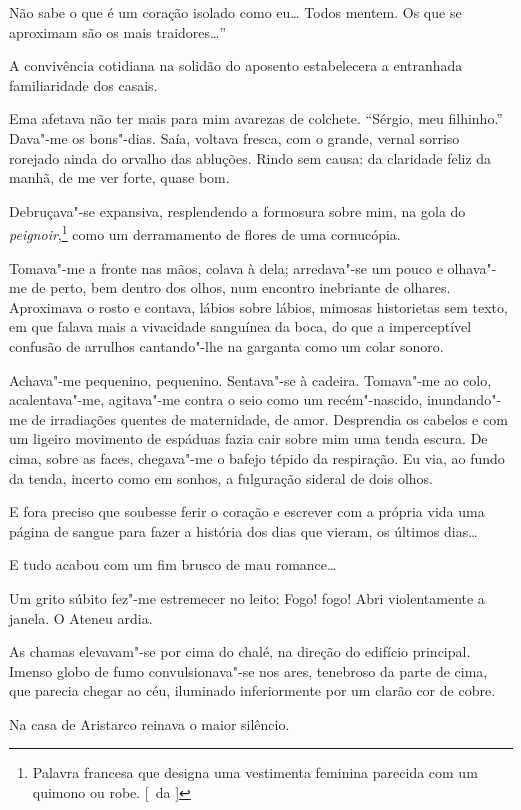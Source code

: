 Não sabe o que é um coração isolado como eu\ldots{}
Todos mentem. Os que se aproximam são os mais traidores\ldots{}'' 

A convivência cotidiana na solidão do aposento estabelecera a entranhada
familiaridade dos casais. 

Ema afetava não ter mais para mim avarezas de
colchete. ``Sérgio, meu filhinho.'' Dava"-me os bons"-dias. Saía, voltava
fresca, com o grande, vernal sorriso rorejado ainda do orvalho das
abluções. Rindo sem causa: da claridade feliz da manhã, de me ver
forte, quase bom. 

Debruçava"-se expansiva, resplendendo a formosura
sobre mim, na gola do \textit{peignoir},\footnote{ Palavra francesa que 
designa uma vestimenta feminina parecida com um quimono ou robe. [~da ]} 
como um derramamento de flores de uma cornucópia. 

Tomava"-me a fronte nas mãos, colava à dela; arredava"-se
um pouco e olhava"-me de perto, bem dentro dos olhos, num encontro
inebriante de olhares. Aproximava o rosto e contava, lábios sobre
lábios, mimosas historietas sem texto, em que falava mais a vivacidade
sanguínea da boca, do que a imperceptível confusão de arrulhos
cantando"-lhe na garganta como um colar sonoro. 

Achava"-me pequenino,
pequenino. Sentava"-se à cadeira. Tomava"-me ao colo,
acalentava"-me, agitava"-me contra o seio como um recém"-nascido,
inundando"-me de irradiações quentes de maternidade, de amor.
Desprendia os cabelos e com um ligeiro movimento de espáduas fazia cair
sobre mim uma tenda escura. De cima, sobre as faces, chegava"-me o
bafejo tépido da respiração. Eu via, ao fundo da tenda, incerto como em
sonhos, a fulguração sideral de dois olhos. 

E fora preciso que soubesse
ferir o coração e escrever com a própria vida uma página de sangue para
fazer a história dos dias que vieram, os últimos dias\ldots{} 

E tudo acabou com um fim brusco de mau romance\ldots{} 

Um grito súbito 
fez"-me estremecer no leito: Fogo! fogo! Abri violentamente a janela. 
O Ateneu ardia. 

As chamas elevavam"-se por cima do 
chalé, na direção do edifício
principal. Imenso globo de fumo convulsionava"-se nos ares, tenebroso
da parte de cima, que parecia chegar ao céu, iluminado inferiormente
por um clarão cor de cobre. 

Na casa de Aristarco reinava o maior silêncio. 

